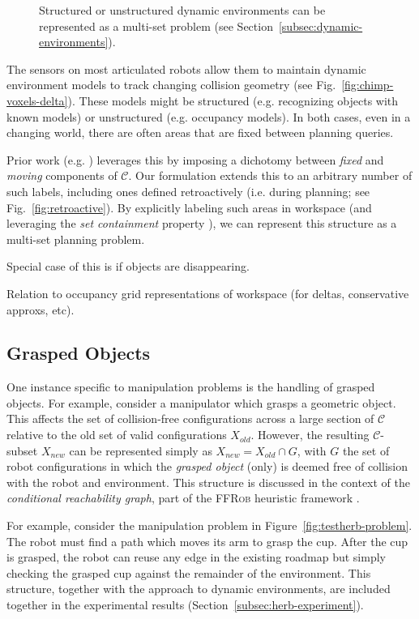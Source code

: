 \begin{figure}
\caption{
  Structured or unstructured dynamic environments
  can be represented as a multi-set problem
  (see Section~\ref{subsec:dynamic-environments}).}
\label{fig:dynamic-environments}
\end{figure}

The sensors on most articulated robots allow them to maintain
dynamic environment models to track changing collision geometry
(see Fig.~\ref{fig:chimp-voxels-delta}).
These models might be
structured (e.g. recognizing objects with known models)
or unstructured (e.g. occupancy models).
In both cases,
even in a changing world,
there are often areas that are fixed between planning queries.

Prior work (e.g. \cite{jaillet2004dynamicprm})
leverages this by imposing a dichotomy between
\emph{fixed} and \emph{moving} components of $\mathcal{C}$.
Our formulation extends this to an arbitrary number of such labels,
including ones defined retroactively (i.e. during planning;
see Fig.~\ref{fig:retroactive}).
By explicitly labeling such areas in workspace
(and leveraging the \emph{set containment} property
\cite{newmanbranicky1991cspacetransforms}),
we can represent this structure as a multi-set planning problem.

Special case of this is if objects are disappearing.

Relation to occupancy grid representations of workspace
(for deltas, conservative approxs, etc).

\subsection{Grasped Objects}
\label{subsec:grasped-objects}

One instance specific to manipulation problems is the handling of
grasped objects.
For example, 
consider a manipulator which grasps a geometric object.
This affects the set of collision-free configurations
across a large section of $\mathcal{C}$
relative to the old set of valid configurations $X_{old}$.
However,
the resulting $\mathcal{C}$-subset $X_{new}$
can be represented simply as
$X_{new} = X_{old} \cap G$,
with $G$ the set of robot configurations in which
the \emph{grasped object} (only)
is deemed free of collision with the robot and environment.
This structure is discussed in the context of the
\emph{conditional reachability graph},
part of the \textsc{FFRob} heuristic framework
\cite{garrett2014ffrob}.

For example,
consider the manipulation problem in
Figure~\ref{fig:testherb-problem}.
The robot must find a path which moves its arm to grasp the cup.
After the cup is grasped,
the robot can reuse any edge in the existing roadmap
but simply checking the grasped cup
against the remainder of the environment.
This structure,
together with the approach to dynamic environments,
are included together in the experimental results
(Section~\ref{subsec:herb-experiment}).

